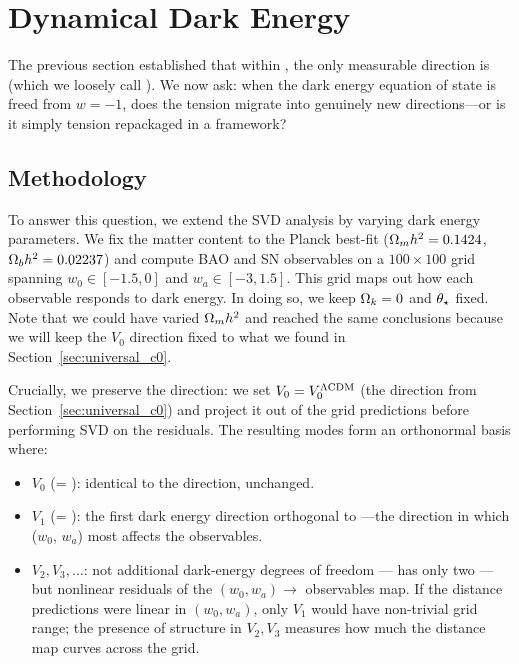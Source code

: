 
\section{Dynamical Dark Energy}
\label{sec:w0wa_reinterpretation}



The previous section established that within \LCDM, the only measurable direction is \czero (which we loosely call \omh). We now ask: when the dark energy equation of state is freed from $w = -1$, does the tension migrate into genuinely new directions---or is it simply \czero tension repackaged in a \wowa framework?

\subsection{Methodology}
\label{sec:w0wa_method}

To answer this question, we extend the SVD analysis by varying dark energy parameters. We fix the matter content to the Planck \LCDM best-fit ($\Omega_m h^2 = 0.1424$, $\Omega_b h^2 = 0.02237$) and compute BAO and SN observables on a $100 \times 100$ grid spanning $w_0 \in [-1.5, 0]$ and $w_a \in [-3, 1.5]$. This grid maps out how each observable responds to dark energy. In doing so, we keep $\Omega_k = 0$ and $\theta_\star$ fixed. Note that we could have varied $\Omega_m h^2$ and reached the same conclusions because we will keep the $V_0$ direction fixed to what we found in Section~\ref{sec:universal_c0}.

Crucially, we preserve the \LCDM \czero direction: we set $V_0 = V_0^\mathrm{\Lambda\mathrm{CDM}}$ (the \omh direction from Section~\ref{sec:universal_c0}) and project it out of the grid predictions before performing SVD on the residuals. The resulting modes form an orthonormal basis where:
\begin{itemize}
\item $V_0$ (= \czero): identical to the \LCDM \omh direction, unchanged.
\item $V_1$ (= \cone): the first dark energy direction orthogonal to \omh---the direction in which ($w_0$, $w_a$) most affects the observables.
\item $V_2, V_3, \ldots$: not additional dark-energy degrees of freedom --- \wowa has only two --- but nonlinear residuals of the $(w_0, w_a) \to$ observables map. If the distance predictions were linear in $(w_0, w_a)$, only $V_1$ would have non-trivial grid range; the presence of structure in $V_2, V_3$ measures how much the distance map curves across the grid.
\end{itemize}

